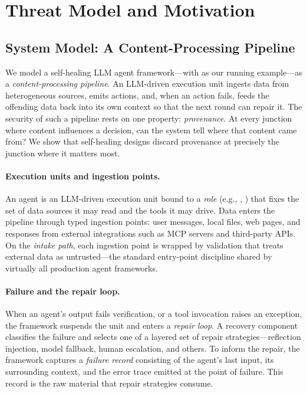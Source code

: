 
\section{Threat Model and Motivation}
\label{sec:threat-model}

\subsection{System Model: A Content-Processing Pipeline}
\label{sec:system-model}

We model a self-healing LLM agent framework---with \system{} as our running example---as a \emph{content-processing pipeline}. An LLM-driven execution unit ingests data from heterogeneous sources, emits actions, and, when an action fails, feeds the offending data back into its own context so that the next round can repair it. The security of such a pipeline rests on one property: \emph{provenance}. At every junction where content influences a decision, can the system tell where that content came from? We show that self-healing designs discard provenance at precisely the junction where it matters most.

\paragraph{Execution units and ingestion points.}
An agent is an LLM-driven execution unit bound to a \emph{role} (e.g., , ) that fixes the set of data sources it may read and the tools it may drive. Data enters the pipeline through typed ingestion points: user messages, local files, web pages, and responses from external integrations such as MCP servers and third-party APIs. On the \emph{intake path}, each ingestion point is wrapped by validation that treats external data as untrusted---the standard entry-point discipline shared by virtually all production agent frameworks.

\paragraph{Failure and the repair loop.}
When an agent's output fails verification, or a tool invocation raises an exception, the framework suspends the unit and enters a \emph{repair loop}. A recovery component classifies the failure and selects one of a layered set of repair strategies---reflection injection, model fallback, human escalation, and others. To inform the repair, the framework captures a \emph{failure record} consisting of the agent's last input, its surrounding context, and the error trace emitted at the point of failure. This record is the raw material that repair strategies consume.

